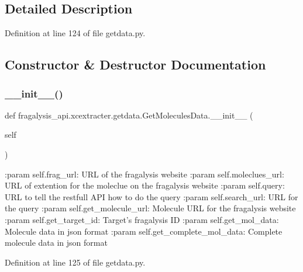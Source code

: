\subsection{Detailed Description}


Definition at line 124 of file getdata.\+py.



\subsection{Constructor \& Destructor Documentation}
\mbox{\label{classfragalysis__api_1_1xcextracter_1_1getdata_1_1_get_molecules_data_a11e4a33bfbb0ff558ef33a0e8a46c76b}} 
\subsubsection{\texorpdfstring{\+\_\+\+\_\+init\+\_\+\+\_\+()}{\_\_init\_\_()}}
{\footnotesize\ttfamily def fragalysis\+\_\+api.\+xcextracter.\+getdata.\+Get\+Molecules\+Data.\+\_\+\+\_\+init\+\_\+\+\_\+ (\begin{DoxyParamCaption}\item[{}]{self }\end{DoxyParamCaption})}

\begin{DoxyVerb}:param self.frag_url: URL of the fragalysis website
:param self.moleclues_url: URL of extention for the moleclue on the fragalysis website
:param self.query: URL to tell the restfull API how to do the query
:param self.search_url: URL for the query 
:param self.get_molecule_url: Molecule URL for the fragalysis website
:param self.get_target_id: Target's fragalysis ID 
:param self.get_mol_data: Molecule data in json format
:param self.get_complete_mol_data: Complete molecule data in json format
\end{DoxyVerb}
 

Definition at line 125 of file getdata.\+py.


